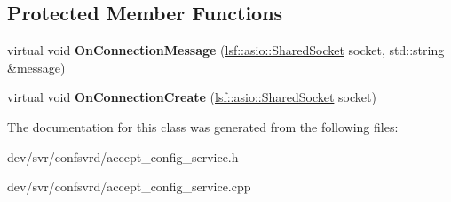 \subsection*{Protected Member Functions}
\begin{DoxyCompactItemize}
\item 
\hypertarget{classAcceptConfigService_a2143d2e4f6c4c407e2014d6144856a94}{
virtual void {\bfseries OnConnectionMessage} (\hyperlink{classlsf_1_1asio_1_1SharedSocket}{lsf::asio::SharedSocket} socket, std::string \&message)}
\label{classAcceptConfigService_a2143d2e4f6c4c407e2014d6144856a94}

\item 
\hypertarget{classAcceptConfigService_a7b890889d04e60f264af45283fce58de}{
virtual void {\bfseries OnConnectionCreate} (\hyperlink{classlsf_1_1asio_1_1SharedSocket}{lsf::asio::SharedSocket} socket)}
\label{classAcceptConfigService_a7b890889d04e60f264af45283fce58de}

\end{DoxyCompactItemize}


The documentation for this class was generated from the following files:\begin{DoxyCompactItemize}
\item 
dev/svr/confsvrd/accept\_\-config\_\-service.h\item 
dev/svr/confsvrd/accept\_\-config\_\-service.cpp\end{DoxyCompactItemize}
